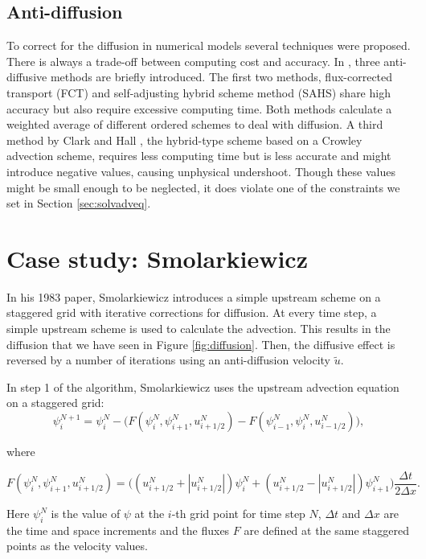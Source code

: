 \documentclass[10pt, a4paper]{article}
\newcommand{\abs}[1]{\left\lvert#1\right\rvert}
\begin{document}
\subsection{Anti-diffusion}
To correct for the diffusion in numerical models several techniques were proposed. There is always a trade-off between computing cost and accuracy. In \cite{smolarki}, three anti-diffusive methods are briefly introduced. The first two methods, flux-corrected transport (FCT) \cite{borisbook} and self-adjusting hybrid scheme method (SAHS) \cite{hartenzwas} share high accuracy but also require excessive computing time. Both methods calculate a weighted average of different ordered schemes to deal with diffusion. A third method by Clark and Hall \cite{clarkhall}, the hybrid-type scheme based on a Crowley advection scheme, requires less computing time but is less accurate and might introduce negative values, causing unphysical undershoot. Though these values might be small enough to be neglected, it does violate one of the constraints we set in Section \ref{sec:solvadveq}.

\section{Case study: Smolarkiewicz}
In his 1983 paper, Smolarkiewicz introduces a simple upstream scheme on a staggered grid with iterative corrections for diffusion. At every time step, a simple upstream scheme is used to calculate the advection. This results in the diffusion that we have seen in Figure \ref{fig:diffusion}. Then, the diffusive effect is reversed by a number of iterations using an anti-diffusion velocity $\tilde{u}$.

In step 1 of the algorithm, Smolarkiewicz uses the upstream advection equation on a staggered grid:
\begin{equation}
 \psi_i^{N+1} = \psi_i^N - \Big( F \left( \psi_i^N,\psi_{i+1}^N,u_{i+1/2}^N\right)
-F \left( \psi_{i-1}^N,\psi_{i}^N,u_{i-1/2}^N\right) \Big),\label{eq:noanti}
\end{equation}

where

\begin{equation}
F \left( \psi_i^N,\psi_{i+1}^N,u_{i+1/2}^N\right) =
\Big( \left( u_{i+1/2}^N + \abs{u_{i+1/2}^N} \right) \psi_i^N
+ \left( u_{i+1/2}^N - \abs{u_{i+1/2}^N} \right) \psi_{i+1}^N \Big)
\frac{\Delta t}{2 \Delta x}.
\end{equation}


Here $\psi_i^N$ is the value of $\psi$ at the $i$-th grid point for time step $N$, $\Delta t$ and $\Delta x$ are the time and space increments and the fluxes $F$ are defined at the same staggered points as the velocity values.
\end{document}
